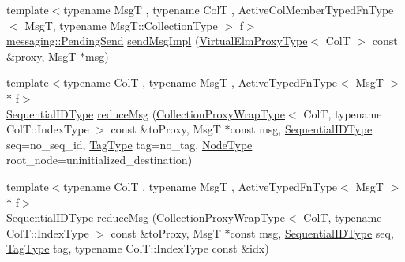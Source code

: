 \begin{DoxyCompactItemize}
\item 
{\footnotesize template$<$typename MsgT , typename ColT , Active\+Col\+Member\+Typed\+Fn\+Type$<$ Msg\+T, typename Msg\+T\+::\+Collection\+Type $>$ f$>$ }\\\hyperlink{structvt_1_1messaging_1_1_pending_send}{messaging\+::\+Pending\+Send} \hyperlink{structvt_1_1vrt_1_1collection_1_1_collection_manager_afc14691c6992cc5d7e51118b1386b67c}{send\+Msg\+Impl} (\hyperlink{namespacevt_1_1vrt_a620a5c8c59d13e513f690c74b4af516f}{Virtual\+Elm\+Proxy\+Type}$<$ ColT $>$ const \&proxy, MsgT $\ast$msg)
\item 
{\footnotesize template$<$typename ColT , typename MsgT , Active\+Typed\+Fn\+Type$<$ Msg\+T $>$ $\ast$ f$>$ }\\\hyperlink{namespacevt_a3063d4db3b879d6dd2c7b8d50995c7f6}{Sequential\+I\+D\+Type} \hyperlink{structvt_1_1vrt_1_1collection_1_1_collection_manager_a2c2ecdb6b35406639ed3a3fc4f45c7b9}{reduce\+Msg} (\hyperlink{structvt_1_1vrt_1_1collection_1_1_collection_manager_a56458ed7f9bb22b631b9b3a745f42f94}{Collection\+Proxy\+Wrap\+Type}$<$ ColT, typename Col\+T\+::\+Index\+Type $>$ const \&to\+Proxy, MsgT $\ast$const msg, \hyperlink{namespacevt_a3063d4db3b879d6dd2c7b8d50995c7f6}{Sequential\+I\+D\+Type} seq=no\+\_\+seq\+\_\+id, \hyperlink{namespacevt_a84ab281dae04a52a4b243d6bf62d0e52}{Tag\+Type} tag=no\+\_\+tag, \hyperlink{namespacevt_a866da9d0efc19c0a1ce79e9e492f47e2}{Node\+Type} root\+\_\+node=uninitialized\+\_\+destination)
\item 
{\footnotesize template$<$typename ColT , typename MsgT , Active\+Typed\+Fn\+Type$<$ Msg\+T $>$ $\ast$ f$>$ }\\\hyperlink{namespacevt_a3063d4db3b879d6dd2c7b8d50995c7f6}{Sequential\+I\+D\+Type} \hyperlink{structvt_1_1vrt_1_1collection_1_1_collection_manager_aa24e7490a90e19962634be37e7d8fe95}{reduce\+Msg} (\hyperlink{structvt_1_1vrt_1_1collection_1_1_collection_manager_a56458ed7f9bb22b631b9b3a745f42f94}{Collection\+Proxy\+Wrap\+Type}$<$ ColT, typename Col\+T\+::\+Index\+Type $>$ const \&to\+Proxy, MsgT $\ast$const msg, \hyperlink{namespacevt_a3063d4db3b879d6dd2c7b8d50995c7f6}{Sequential\+I\+D\+Type} seq, \hyperlink{namespacevt_a84ab281dae04a52a4b243d6bf62d0e52}{Tag\+Type} tag, typename Col\+T\+::\+Index\+Type const \&idx)
\item 

\end{DoxyCompactItemize}
